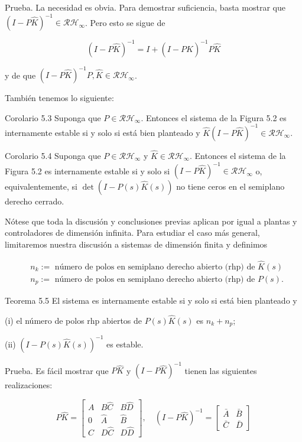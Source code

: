 Prueba. La necesidad es obvia. Para demostrar suficiencia, basta mostrar que $(I-P \hat{K})^{-1} \in \mathcal{R} \mathcal{H}_{\infty}$. Pero esto se sigue de

$$
(I-P \hat{K})^{-1}=I+(I-P \hat{K})^{-1} P \hat{K}
$$

y de que $(I-P \hat{K})^{-1} P, \hat{K} \in \mathcal{R} \mathcal{H}_{\infty}$.

También tenemos lo siguiente:

Corolario 5.3 Suponga que $P \in \mathcal{R} \mathcal{H}_{\infty}$. Entonces el sistema de la Figura 5.2 es internamente estable si y solo si está bien planteado y $\hat{K}(I-P \hat{K})^{-1} \in \mathcal{R} \mathcal{H}_{\infty}$.

Corolario 5.4 Suponga que $P \in \mathcal{R} \mathcal{H}_{\infty}$ y $\hat{K} \in \mathcal{R} \mathcal{H}_{\infty}$. Entonces el sistema de la Figura 5.2 es internamente estable si y solo si $(I-P \hat{K})^{-1} \in \mathcal{R} \mathcal{H}_{\infty}$ o, equivalentemente, si $\operatorname{det}(I-P(s) \hat{K}(s))$ no tiene ceros en el semiplano derecho cerrado.

Nótese que toda la discusión y conclusiones previas aplican por igual a plantas y controladores de dimensión infinita. Para estudiar el caso más general, limitaremos nuestra discusión a sistemas de dimensión finita y definimos

$$
\begin{aligned}
& n_{k}:=\text { número de polos en semiplano derecho abierto (rhp) de } \hat{K}(s) \\
& n_{p}:=\text { número de polos en semiplano derecho abierto (rhp) de } P(s) .
\end{aligned}
$$

Teorema 5.5 El sistema es internamente estable si y solo si está bien planteado y

(i) el número de polos rhp abiertos de $P(s) \hat{K}(s)$ es $n_{k}+n_{p}$;

(ii) $(I-P(s) \hat{K}(s))^{-1}$ es estable.

Prueba. Es fácil mostrar que $P \hat{K}$ y $(I-P \hat{K})^{-1}$ tienen las siguientes realizaciones:

$$
P \hat{K}=\left[\begin{array}{cc|c}
A & B \hat{C} & B \hat{D} \\
0 & \hat{A} & \hat{B} \\
\hline C & D \hat{C} & D \hat{D}
\end{array}\right], \quad(I-P \hat{K})^{-1}=\left[\begin{array}{c|c}
\bar{A} & \bar{B} \\
\hline \bar{C} & \bar{D}
\end{array}\right]
$$

